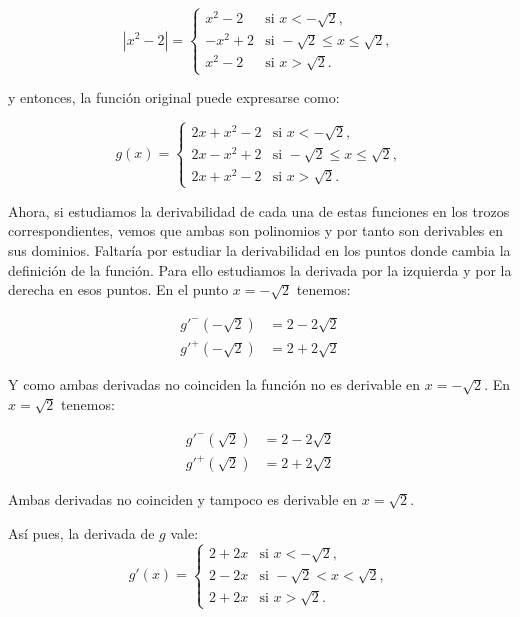 \documentclass[
  spanish,
  a4paper,
]{scrreport}
\theoremstyle{definition}
\theoremstyle{remark}
\begin{document}
\begin{tcolorbox}
\begin{enumerate}
  \[
   |x^2-2| =
   \begin{cases}
   x^2-2 & \mbox{si } x<-\sqrt{2}, \\
   -x^2+2 & \mbox{si } -\sqrt{2} \leq x \leq \sqrt{2},\\
   x^2-2 & \mbox{si } x > \sqrt{2}.
   \end{cases}
   \]

  y entonces, la función original puede expresarse como:

  \[
   g(x) =
   \begin{cases}
   2x+x^2-2 & \mbox{si } x< -\sqrt{2}, \\
   2x-x^2+2 & \mbox{si } -\sqrt{2} \leq x \leq \sqrt{2},\\
   2x+x^2-2 & \mbox{si } x > \sqrt{2}.
   \end{cases}
   \]

  Ahora, si estudiamos la derivabilidad de cada una de estas funciones
  en los trozos correspondientes, vemos que ambas son polinomios y por
  tanto son derivables en sus dominios. Faltaría por estudiar la
  derivabilidad en los puntos donde cambia la definición de la función.
  Para ello estudiamos la derivada por la izquierda y por la derecha en
  esos puntos. En el punto \(x=-\sqrt 2\) tenemos:

  \begin{align*}
   g'^-(-\sqrt{2}) &= 2-2\sqrt 2\\
   g'^+(-\sqrt{2}) &= 2+2\sqrt 2
   \end{align*}

  Y como ambas derivadas no coinciden la función no es derivable en
  \(x=-\sqrt 2\). En \(x=\sqrt{2}\) tenemos:

  \begin{align*}
   g'^-(\sqrt{2}) &= 2-2\sqrt 2\\
   g'^+(\sqrt{2}) &= 2+2\sqrt 2
   \end{align*}

  Ambas derivadas no coinciden y tampoco es derivable en \(x=\sqrt 2\).

  Así pues, la derivada de \(g\) vale: \[
   g'(x)=
   \begin{cases}
   2+2x & \mbox{si } x< -\sqrt{2}, \\
   2-2x & \mbox{si } -\sqrt{2} < x < \sqrt{2},\\
   2+2x & \mbox{si } x > \sqrt{2}.
   \end{cases}
   \]
\end{enumerate}

\end{tcolorbox}
\end{document}
